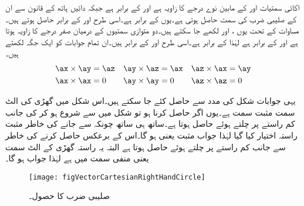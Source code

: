 اکائی سمتیات  اور  کے مابین نوے درجے کا زاویہ ہے  اور  کے برابر ہے جبکہ دائیں ہاتھ کے قانون سے ان کے صلیبی ضرب کی سمت  حاصل ہوتی ہے۔یوں  کے برابر ہے۔اسی طرح  اور  کے برابر حاصل ہوتے ہیں۔مساوات  کے تحت یوں ،  اور  لکھے جا سکتے ہیں۔دو متوازی سمتیوں کے درمیان صفر درجے کا زاویہ ہوتا ہے اور  کے برابر ہے لہٰذا  کے برابر ہے۔اسی طرح  اور  کے برابر ہیں۔ان تمام جوابات کو ایک جگہ لکھتے ہیں۔
\begin{gather}
\begin{aligned}\label{مساوات_سمتیہ_کارتیسی_اکائی_سمتیات_صلیبی_ضرب}
\ax \times \ay &=\az & \ay \times \az&=\ax & \az \times \ax&=\ay\\
\ax \times \ax&=0 & \ay \times \ay&=0 & \az \times \az&=0
\end{aligned}
\end{gather}

یہی جوابات شکل  کی مدد سے حاصل کئے جا سکتے ہیں۔اس شکل میں گھڑی کی الٹ سمت مثبت سمت ہے۔یوں اگر  حاصل کرنا ہو تو شکل میں  سے شروع ہو کر  کی جانب کم راستے پر چلتے ہوئے   حاصل ہوتا ہے۔ساتھ ہی ساتھ چونکہ  سے  جانے کی خاطر  مثبت راستہ اختیار کیا گیا لہٰذا جواب مثبت یعنی  ہو گا۔اس کے برعکس  حاصل کرنے کی خاطر  سے  جانب کم راستے پر چلتے ہوئے  حاصل ہوتا ہے البتہ یہ راستہ گھڑی کے الٹ سمت یعنی منفی سمت میں ہے لہٰذا جواب  ہو گا۔ 
\begin{figure}
\centering
\texttt{[image: figVectorCartesianRightHandCircle]}
\caption{صلیبی ضرب کا حصول۔}
\label{شکل_سمتیہ_صلیبی_ضرب_مثبت_دائرہ}
\end{figure}

